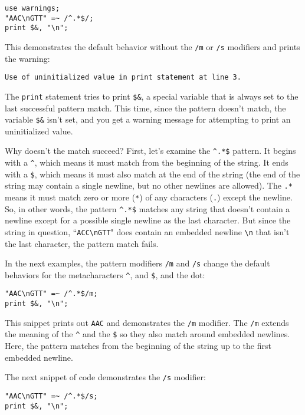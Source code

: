 \begin{lstlisting}
use warnings;
"AAC\nGTT" =~ /^.*$/;
print $&, "\n";
\end{lstlisting}

This demonstrates the default behavior without the \verb|/m| or \verb|/s| modifiers and prints the warning:

\begin{lstlisting}
Use of uninitialized value in print statement at line 3.
\end{lstlisting}

The \verb|print| statement tries to print \verb|$&|, a special variable that is always set to the last successful pattern match. This time, since the pattern doesn't match, the variable \verb|$&| isn't set, and you get a warning message for attempting to print an uninitialized value.

Why doesn't the match succeed? First, let's examine the \verb|^.*$| pattern. It begins with a \verb|^|, which means it must match from the beginning of the string. It ends with a \verb|$|, which means it must also match at the end of the string (the end of the string may contain a single newline, but no other newlines are allowed). The \verb|.*| means it must match zero or more (\verb|*|) of any characters (\verb|.|) except the newline. So, in other words, the pattern \verb|^.*$| matches any string that doesn't contain a newline except for a possible single newline as the last character. But since the string in question, ``\verb|ACC\nGTT|" does contain an embedded newline \verb|\n| that isn't the last character, the pattern match fails.

In the next examples, the pattern modifiers \verb|/m| and \verb|/s| change the default behaviors for the metacharacters \verb|^|, and \verb|$|, and the dot:

\begin{lstlisting}
"AAC\nGTT" =~ /^.*$/m;
print $&, "\n";
\end{lstlisting}

This snippet prints out \verb|AAC| and demonstrates the \verb|/m| modifier. The \verb|/m| extends the meaning of the \verb|^| and the \verb|$| so they also match around embedded newlines. Here, the pattern matches from the beginning of the string up to the first embedded newline.

The next snippet of code demonstrates the \verb|/s| modifier:

\begin{lstlisting}
"AAC\nGTT" =~ /^.*$/s;
print $&, "\n";
\end{lstlisting}

